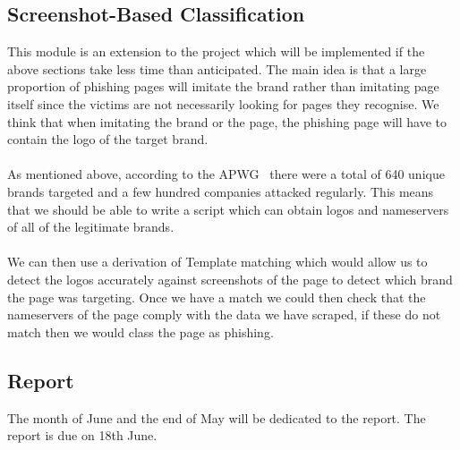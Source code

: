 \subsection{Screenshot-Based Classification}
This module is an extension to the project which will be implemented if the above sections take less time than anticipated. The main idea is that a large proportion of phishing pages will imitate the brand rather than imitating page itself since the victims are not necessarily looking for pages they recognise. We think that when imitating the brand or the page, the phishing page will have to contain the logo of the target brand.
\\\\
As mentioned above, according to the APWG~\cite{apwg} there were a total of 640 unique brands targeted and a few hundred companies attacked regularly. This means that we should be able to write a script which can obtain logos and nameservers of all of the legitimate brands.
\\\\
We can then use a derivation of Template matching which would allow us to detect the logos accurately against screenshots of the page to detect which brand the page was targeting. Once we have a match we could then check that the nameservers of the page comply with the data we have scraped, if these do not match then we would class the page as phishing.
\subsection{Report}
The month of June and the end of May will be dedicated to the report. The report is due on 18th June.
\newpage
